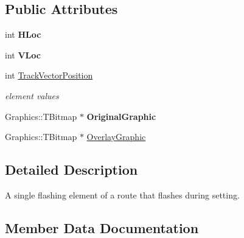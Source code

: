 \subsection*{Public Attributes}
\begin{DoxyCompactItemize}
\item 
\mbox{\label{class_t_one_route_1_1_t_route_flash_element_a8cf67aa3834691980c671c4dd1502945}} 
int {\bfseries H\+Loc}
\item 
\mbox{\label{class_t_one_route_1_1_t_route_flash_element_a755fdeb7549ed1764d0c8d97e085e940}} 
int {\bfseries V\+Loc}
\item 
\mbox{\label{class_t_one_route_1_1_t_route_flash_element_ac74a501ef76bca88e523be8b80af9d4c}} 
int \mbox{\hyperlink{class_t_one_route_1_1_t_route_flash_element_ac74a501ef76bca88e523be8b80af9d4c}{Track\+Vector\+Position}}
\begin{DoxyCompactList}\small\item\em element values \end{DoxyCompactList}\item 
\mbox{\label{class_t_one_route_1_1_t_route_flash_element_ae726a745a5d6760f7cfff05f90392f24}} 
Graphics\+::\+T\+Bitmap $\ast$ {\bfseries Original\+Graphic}
\item 
Graphics\+::\+T\+Bitmap $\ast$ \mbox{\hyperlink{class_t_one_route_1_1_t_route_flash_element_a9728c9fe83d991d41596efa2cf07129f}{Overlay\+Graphic}}
\end{DoxyCompactItemize}


\subsection{Detailed Description}
A single flashing element of a route that flashes during setting. 

\subsection{Member Data Documentation}
\mbox{\label{class_t_one_route_1_1_t_route_flash_element_a9728c9fe83d991d41596efa2cf07129f}} 
